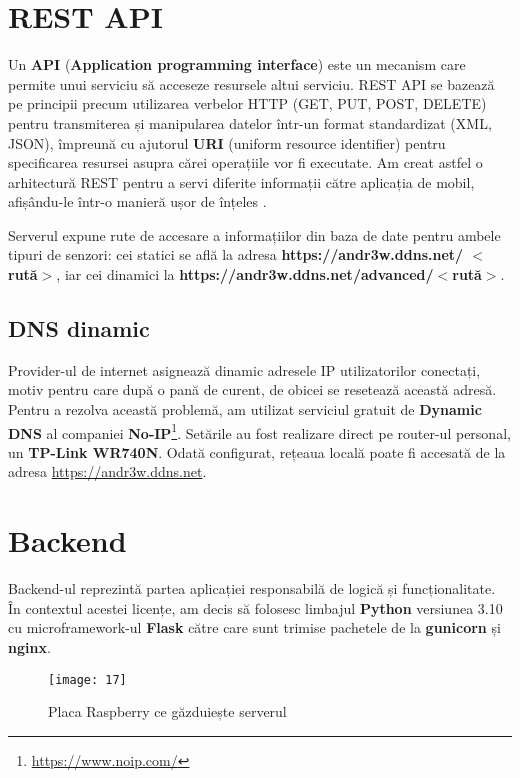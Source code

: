 \section{REST API}

Un \textbf{API} (\textbf{Application programming interface}) este un mecanism care permite unui serviciu să acceseze resursele altui serviciu. REST API se bazează pe principii precum utilizarea verbelor HTTP (GET, PUT, POST, DELETE) pentru transmiterea și manipularea datelor într-un format standardizat (XML, JSON), împreună cu ajutorul \textbf{URI} (uniform resource identifier) pentru specificarea resursei asupra cărei operațiile vor fi executate. Am creat astfel o arhitectură REST pentru a servi diferite informații către aplicația de mobil, afișându-le într-o manieră ușor de înțeles \cite{rest}.

Serverul expune rute de accesare a informațiilor din baza de date pentru ambele tipuri de senzori: cei statici se află la adresa \textbf{https://andr3w.ddns.net/ $<$rută$>$}, iar cei dinamici la \textbf{https://andr3w.ddns.net/advanced/$<$rută$>$}.

\subsection{DNS dinamic}

Provider-ul de internet asignează dinamic adresele IP utilizatorilor conectați, motiv pentru care după o pană de curent, de obicei se resetează această adresă. Pentru a rezolva această problemă, am utilizat serviciul gratuit de \textbf{Dynamic DNS}\cite{noip} al companiei \textbf{No-IP}\footnote{\url{https://www.noip.com/}}. Setările au fost realizare direct pe router-ul personal, un \textbf{TP-Link WR740N}. Odată configurat, rețeaua locală poate fi accesată de la adresa \url{https://andr3w.ddns.net}.

\section{Backend}

Backend-ul reprezintă partea aplicației responsabilă de logică și funcționalitate. În contextul acestei licențe, am decis să folosesc limbajul \textbf{Python} versiunea 3.10 cu microframework-ul \textbf{Flask} către care sunt trimise pachetele de la \textbf{gunicorn} și \textbf{nginx}.

\begin{figure}[h]
	\centering
	\texttt{[image: 17]}
	\caption{Placa Raspberry ce găzduiește serverul}
	\label{fig:17}
\end{figure}

